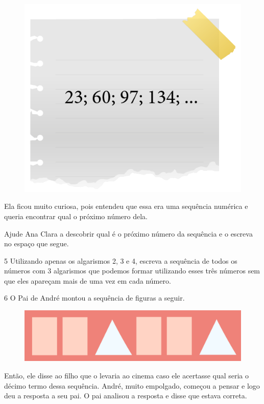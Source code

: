 \begin{figure}[htpb!]
\centering
\includegraphics[width=.6\textwidth]{../ilustracoes/MAT5/SAEB_5ANO_MAT_figura27.png}
\end{figure}

Ela ficou muito curiosa, pois entendeu que essa era uma sequência
numérica e queria encontrar qual o próximo número dela.

Ajude Ana Clara a descobrir qual é o próximo número da sequência e o escreva no espaço que segue.


\num{5} Utilizando apenas os algarismos 2, 3 e 4, escreva a sequência de
todos os números com 3 algarismos que podemos formar utilizando esses
três números sem que eles apareçam mais de uma vez em cada número.


\pagebreak
\num{6} O Pai de André montou a sequência de figuras a seguir.

\begin{figure}[htpb!]
\centering
\includegraphics[width=\textwidth]{../ilustracoes/MAT5/SAEB_5ANO_MAT_figura28.png}
\end{figure}

Então, ele disse ao filho que o levaria ao cinema caso ele acertasse
qual seria o décimo termo dessa sequência. André, muito empolgado, começou a
pensar e logo deu a resposta a seu pai. O pai analisou a resposta e
disse que estava correta.


